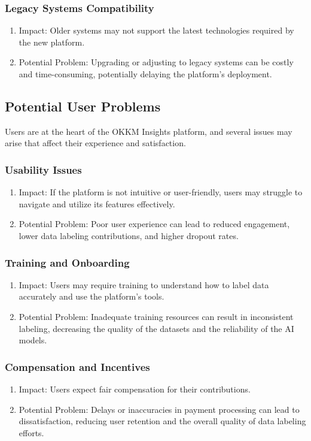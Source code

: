\documentclass[12pt]{article}
\begin{document}
\subsubsection{Legacy Systems Compatibility}
\begin{enumerate}
    \item Impact: Older systems may not support the latest technologies required by the new platform.
    \item Potential Problem: Upgrading or adjusting to legacy systems can be costly and time-consuming, potentially delaying the platform's deployment.
\end{enumerate}
\subsection{Potential User Problems}
Users are at the heart of the OKKM Insights platform, and several issues may arise that affect their experience and satisfaction.
\subsubsection{Usability Issues}
\begin{enumerate}
    \item Impact: If the platform is not intuitive or user-friendly, users may struggle to navigate and utilize its features effectively.
    \item Potential Problem: Poor user experience can lead to reduced engagement, lower data labeling contributions, and higher dropout rates.
\end{enumerate}
\subsubsection{Training and Onboarding}
\begin{enumerate}
    \item Impact: Users may require training to understand how to label data accurately and use the platform's tools.
    \item Potential Problem: Inadequate training resources can result in inconsistent labeling, decreasing the quality of the datasets and the reliability of the AI models.
\end{enumerate}
\subsubsection{Compensation and Incentives}
\begin{enumerate}
    \item Impact: Users expect fair compensation for their contributions.
    \item Potential Problem: Delays or inaccuracies in payment processing can lead to dissatisfaction, reducing user retention and the overall quality of data labeling efforts.
\end{enumerate}
\end{document}
